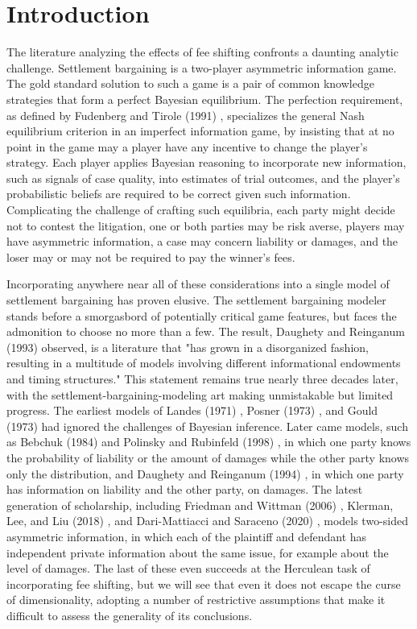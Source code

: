 \documentclass{article}
\begin{document}
\section{Introduction}
The literature analyzing the effects of fee shifting confronts a daunting analytic challenge. Settlement bargaining is a two-player asymmetric information game. The gold standard solution to such a game is a pair of common knowledge strategies that form a perfect Bayesian equilibrium. The perfection requirement, as defined by Fudenberg and Tirole (1991) \cite{fudenberg}, specializes the general Nash \cite{nash} equilibrium criterion in an imperfect information game, by insisting that at no point in the game may a player have any incentive to change the player's strategy. Each player applies Bayesian reasoning to incorporate new information, such as signals of case quality, into estimates of trial outcomes, and the player's probabilistic beliefs are required to be correct given such information. Complicating the challenge of crafting such equilibria, each party might decide not to contest the litigation, one or both parties may be risk averse, players may have asymmetric information, a case may concern liability or damages, and the loser may or may not be required to pay the winner's fees.

Incorporating anywhere near all of these considerations into a single model of settlement bargaining has proven elusive. The settlement bargaining modeler stands before a smorgasbord of potentially critical game features, but faces the admonition to choose no more than a few. The result, Daughety and Reinganum (1993) \cite{daughetyreinganum1993} observed, is a literature that "has grown in a disorganized fashion, resulting in a multitude of models involving different informational endowments and timing structures." This statement remains true nearly three decades later, with the  settlement-bargaining-modeling art making unmistakable but limited progress. The earliest models of Landes (1971) \cite{landes}, Posner (1973) \cite{posner}, and Gould (1973) \cite{gould} had ignored the challenges of Bayesian inference. Later came models, such as Bebchuk (1984) \cite{bebchuk84} and Polinsky and Rubinfeld (1998) \cite{polinskyrubinfeld}, in which one party knows the probability of liability or the amount of damages while the other party knows only the distribution, and Daughety and Reinganum (1994) \cite{daughetyreinganum1994}, in which one party has information on liability and the other party, on damages. The latest generation of scholarship, including Friedman and Wittman (2006) \cite{friedmanwittman}, Klerman, Lee, and Liu (2018) \cite{klermanleeliu}, and Dari-Mattiacci and Saraceno (2020) \cite{darimatiaccisaraceno}, models two-sided asymmetric information, in which each of the plaintiff and defendant has independent private information about the same issue, for example about the level of damages. The last of these even succeeds at the Herculean task of incorporating fee shifting, but we will see that even it does not escape the curse of dimensionality, adopting a number of restrictive assumptions that make it difficult to assess the generality of its conclusions.
\end{document}
